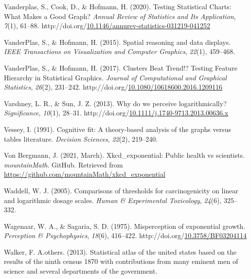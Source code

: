 \documentclass[print]{nuthesis}
\newlength{\cslhangindent}
\newenvironment{CSLReferences}[2]%
{\setlength{\parindent}{0pt}%
\everypar{\setlength{\hangindent}{\cslhangindent}}\ignorespaces}%
{\par}
\begin{document}
\begin{CSLReferences}{1}{0}
\leavevmode{}%
Vanderplas, S., Cook, D., \& Hofmann, H. (2020). Testing {Statistical} {Charts}: {What} {Makes} a {Good} {Graph}? \emph{Annual Review of Statistics and Its Application}, \emph{7}(1), 61--88. http://doi.org/\href{https://doi.org/10.1146/annurev-statistics-031219-041252}{10.1146/annurev-statistics-031219-041252}

\leavevmode{}%
VanderPlas, S., \& Hofmann, H. (2015). Spatial reasoning and data displays. \emph{IEEE Transactions on Visualization and Computer Graphics}, \emph{22}(1), 459--468.

\leavevmode{}%
VanderPlas, S., \& Hofmann, H. (2017). Clusters {Beat} {Trend}!? {Testing} {Feature} {Hierarchy} in {Statistical} {Graphics}. \emph{Journal of Computational and Graphical Statistics}, \emph{26}(2), 231--242. http://doi.org/\href{https://doi.org/10.1080/10618600.2016.1209116}{10.1080/10618600.2016.1209116}

\leavevmode{}%
Varshney, L. R., \& Sun, J. Z. (2013). Why do we perceive logarithmically? \emph{Significance}, \emph{10}(1), 28--31. http://doi.org/\href{https://doi.org/10.1111/j.1740-9713.2013.00636.x}{10.1111/j.1740-9713.2013.00636.x}

\leavevmode{}%
Vessey, I. (1991). Cognitive fit: A theory-based analysis of the graphs versus tables literature. \emph{Decision Sciences}, \emph{22}(2), 219--240.

\leavevmode{}%
Von Bergmann, J. (2021, March). Xkcd\_exponential: Public health vs scientists. \emph{mountainMath}. GitHub. Retrieved from \url{https://github.com/mountainMath/xkcd_exponential}

\leavevmode{}%
Waddell, W. J. (2005). Comparisons of thresholds for carcinogenicity on linear and logarithmic dosage scales. \emph{Human \& Experimental Toxicology}, \emph{24}(6), 325--332.

\leavevmode{}%
Wagenaar, W. A., \& Sagaria, S. D. (1975). Misperception of exponential growth. \emph{Perception \& Psychophysics}, \emph{18}(6), 416--422. http://doi.org/\href{https://doi.org/10.3758/BF03204114}{10.3758/BF03204114}

\leavevmode{}%
Walker, F. A.others. (2013). Statistical atlas of the united states based on the results of the ninth census 1870 with contributions from many eminent men of science and several departments of the government.


\end{CSLReferences}
\end{document}
